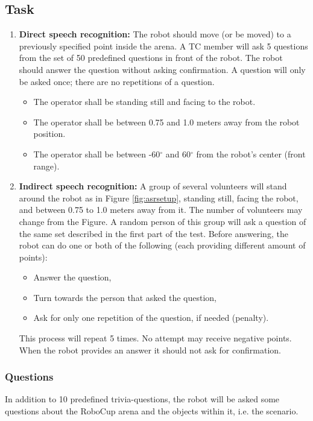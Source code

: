 \subsection{Task}

\begin{enumerate}
\item \textbf{Direct speech recognition: } The robot should move (or be moved) to a previously specified point inside the arena. 
  A TC member will ask 5 questions from the set of 50 predefined questions in front of the robot. 
  The robot should answer the question without asking confirmation.
  A question will only be asked once; there are no repetitions of a question. 
\begin{itemize}
\item The operator shall be standing still and facing to the robot.
\item The operator shall be between 0.75 and 1.0 meters away from the robot position.
\item The operator shall be between -60$^{\circ}$ and 60$^{\circ}$ from the robot's center (front range).
\end{itemize}
\item \textbf{Indirect speech recognition: } A group of several volunteers will stand around the robot as in Figure \ref{fig:asrsetup}, standing still, facing the robot, and between 0.75 to 1.0 meters away from it. The number of volunteers may change from the Figure. A random person of this group will ask a question of the same set described in the first part of the test. Before answering, the robot can do one or both of the following (each providing different amount of points):
\begin{itemize}
\item Answer the question,
\item Turn towards the person that asked the question,
\item Ask for only one repetition of the question, if needed (penalty).
\end{itemize}
This process will repeat 5 times. No attempt may receive negative points. When the robot provides an answer it should not ask for confirmation.
\end{enumerate}

\subsubsection{Questions}
In addition to 10 predefined trivia-questions, the robot will be asked some questions about the RoboCup arena and the objects within it, i.e. the scenario. 

